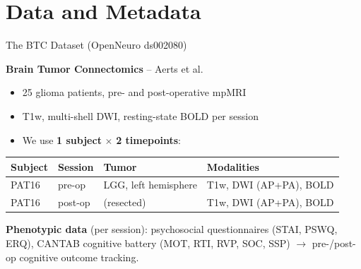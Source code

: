 
\section{Data and Metadata}

\begin{frame}{The BTC Dataset (OpenNeuro ds002080)}

  \textbf{Brain Tumor Connectomics} -- Aerts et al.\
  \cite{Aerts2018,Aerts2022}

  \bigskip

  \begin{itemize}
    \item 25 glioma patients, pre- and post-operative mpMRI
    \item T1w, multi-shell DWI, resting-state BOLD per session
    \item We use \textbf{1 subject} $\times$ \textbf{2 timepoints}:
  \end{itemize}

  \bigskip

  \begin{tabular}{llll}
    \toprule
    \textbf{Subject} & \textbf{Session} & \textbf{Tumor} & \textbf{Modalities} \\
    \midrule
    PAT16 & pre-op  & LGG, left hemisphere & T1w, DWI (AP+PA), BOLD \\
    PAT16 & post-op &  (resected)          & T1w, DWI (AP+PA), BOLD \\
    \bottomrule
  \end{tabular}

  \medskip

  \textbf{Phenotypic data} (per session):
  psychosocial questionnaires (STAI, PSWQ, ERQ),
  CANTAB cognitive battery (MOT, RTI, RVP, SOC, SSP)
  $\to$ pre-/post-op \alert{cognitive outcome} tracking.

\end{frame}


